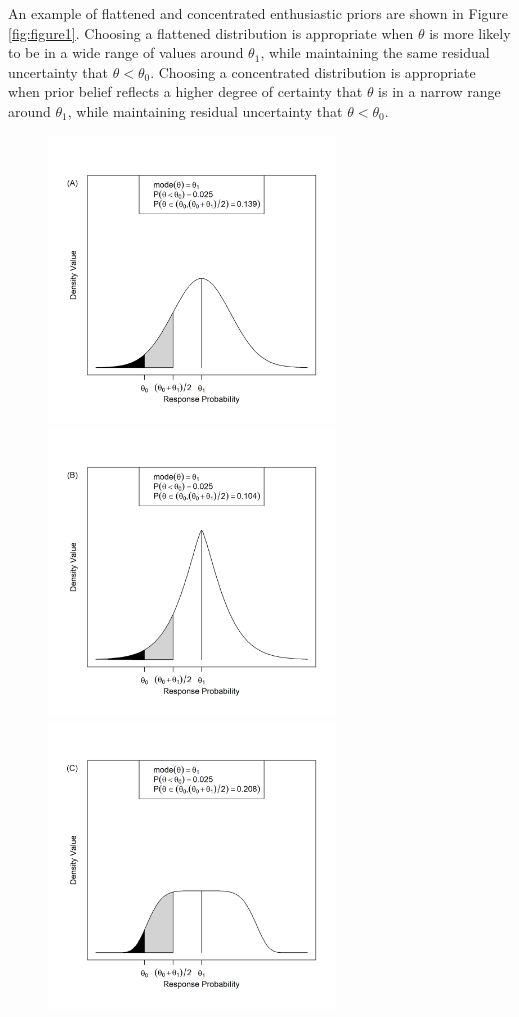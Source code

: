 \documentclass[useAMS,usenatbib,referee]{biom}
\begin{document}
An example of flattened and concentrated enthusiastic priors are shown in Figure \ref{fig:figure1}. Choosing a flattened distribution is appropriate when $\theta$ is more likely to be in a wide range of values around $\theta_1$, while maintaining the same residual uncertainty that $\theta<\theta_0$. Choosing a concentrated distribution is appropriate when prior belief reflects a higher degree of certainty that $\theta$ is in a narrow range around $\theta_1$, while maintaining residual uncertainty that $\theta<\theta_0$. 
\begin{figure}
\begin{center}
\includegraphics[width=3in]{figure1a.png}
\includegraphics[width=3in]{figure1b.png}
\includegraphics[width=3in]{figure1c.png}

\end{center}
\end{figure}
\end{document}
